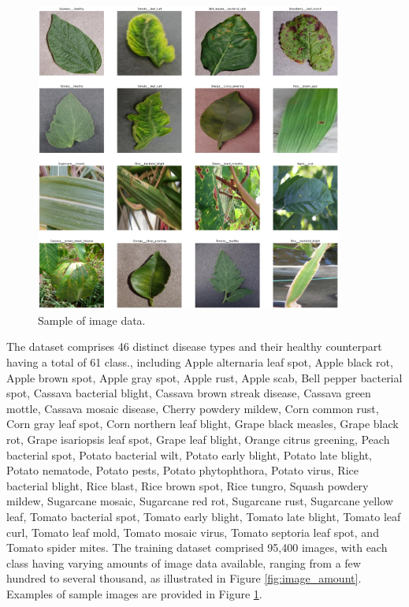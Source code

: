 \documentclass{article}
\begin{document}
\begin{figure}[h]
    \centering
    \includegraphics[width=0.90\textwidth]{sample_image.jpg}
    \caption{Sample of image data.}
    \label{fig:sample_image}
\end{figure}

The dataset comprises 46 distinct disease types and their healthy counterpart having a total of 61 class., including Apple alternaria leaf spot, Apple black rot, Apple brown spot, Apple gray spot, Apple rust, Apple scab, Bell pepper bacterial spot, Cassava bacterial blight, Cassava brown streak disease, Cassava green mottle, Cassava mosaic disease, Cherry powdery mildew, Corn common rust, Corn gray leaf spot, Corn northern leaf blight, Grape black measles, Grape black rot, Grape isariopsis leaf spot, Grape leaf blight, Orange citrus greening, Peach bacterial spot, Potato bacterial wilt, Potato early blight, Potato late blight, Potato nematode, Potato pests, Potato phytophthora, Potato virus, Rice bacterial blight, Rice blast, Rice brown spot, Rice tungro, Squash powdery mildew, Sugarcane mosaic, Sugarcane red rot, Sugarcane rust, Sugarcane yellow leaf, Tomato bacterial spot, Tomato early blight, Tomato late blight, Tomato leaf curl, Tomato leaf mold, Tomato mosaic virus, Tomato septoria leaf spot, and Tomato spider mites. The training dataset comprised 95,400 images, with each class having varying amounts of image data available, ranging from a few hundred to several thousand, as illustrated in Figure \ref{fig:image_amount}. Examples of sample images are provided in Figure \ref{fig:sample_image}.
\end{document}
